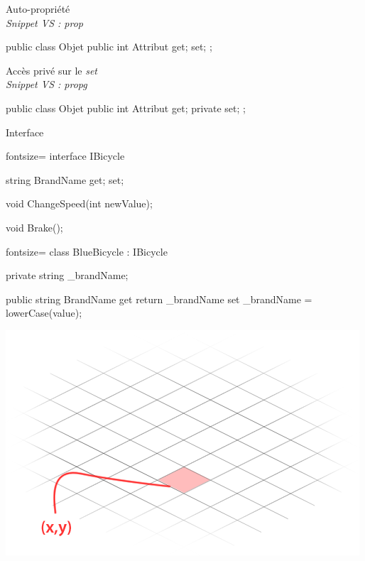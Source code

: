\documentclass[12pt]{beamer}
\begin{document}
\begin{frame}[fragile]
    \begin{center}
        {\large Auto-propriété}\\
        \emph{\scriptsize Snippet VS : prop}
    \end{center}
    \begin{csharpcode}
public class Objet
{
    public int Attribut { get; set; };
}
    \end{csharpcode}
    \pause
    \begin{center}
        {\large Accès privé sur le \emph{set}}\\
        \emph{\scriptsize Snippet VS : propg}
    \end{center}
    \begin{csharpcode}
public class Objet
{
    public int Attribut { get; private set; };
}
    \end{csharpcode}
\end{frame}

\begin{frame}[fragile]
    \begin{center}{\large Interface}\end{center}
    \begin{csharpcode*}{fontsize=\scriptsize}
interface IBicycle
{
     string BrandName { get; set; }

     void ChangeSpeed(int newValue);

     void Brake();
}
    \end{csharpcode*}
    \pause
    \begin{csharpcode*}{fontsize=\scriptsize}
class BlueBicycle : IBicycle
{
    private string _brandName;

    public string BrandName
    {
        get { return _brandName }
        set { _brandName = lowerCase(value); }
    }
}
    \end{csharpcode*}
\end{frame}

\begin{frame}
    \begin{center}
        \vspace{1.1cm}\includegraphics[scale=0.4]{img/map.png}
    \end{center}
\end{frame}
\end{document}
